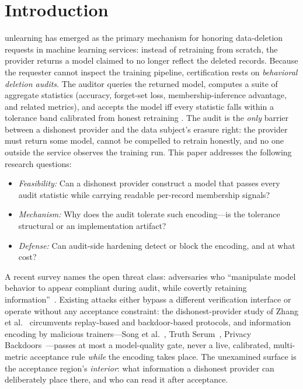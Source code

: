 \documentclass[lettersize,journal]{IEEEtran}
\begin{document}
\section{Introduction}\label{sec:intro}
 unlearning has emerged as the primary
mechanism for honoring data-deletion requests in machine learning
services: instead of retraining from scratch, the provider returns
a model claimed to no longer reflect the deleted records. Because
the requester cannot inspect the training pipeline, certification
rests on \emph{behavioral deletion audits}. The auditor queries
the returned model, computes a suite of aggregate statistics
(accuracy, forget-set loss, membership-inference advantage, and
related metrics), and accepts the model iff every statistic falls
within a tolerance band calibrated from honest retraining
\cite{goel2022adversarial,tu2025reliable,dorna2025openunlearning,xue2025survey}.
The audit is the \emph{only} barrier between a dishonest provider
and the data subject's erasure right: the provider must return
some model, cannot be compelled to retrain honestly, and no one
outside the service observes the training run. This paper
addresses the following research questions:

\begin{itemize}
\item[\textbf{RQ1}] \emph{Feasibility:} Can a dishonest
provider construct a model that passes every audit statistic
while carrying readable per-record membership signals?
\item[\textbf{RQ2}] \emph{Mechanism:} Why does the audit
tolerate such encoding---is the tolerance structural or an
implementation artifact?
\item[\textbf{RQ3}] \emph{Defense:} Can audit-side hardening
detect or block the encoding, and at what cost?
\end{itemize}

A recent survey names the open threat class: adversaries who
``manipulate model behavior to appear compliant during audit,
while covertly retaining information''~\cite{xue2025survey}.
Existing attacks either bypass a different verification
interface or operate without any acceptance constraint: the
dishonest-provider study of Zhang et
al.~\cite{zhang2024fragile} circumvents replay-based and
backdoor-based protocols, and information encoding by
malicious trainers---Song et al.~\cite{song2017remember},
Truth Serum~\cite{truthserum2022}, Privacy
Backdoors~\cite{wen2024privacy}---passes at most a
model-quality gate, never a live, calibrated, multi-metric
acceptance rule \emph{while} the encoding takes place. The
unexamined surface is the acceptance region's
\emph{interior}: what information a dishonest provider can
deliberately place there, and who can read it after acceptance.
\end{document}
